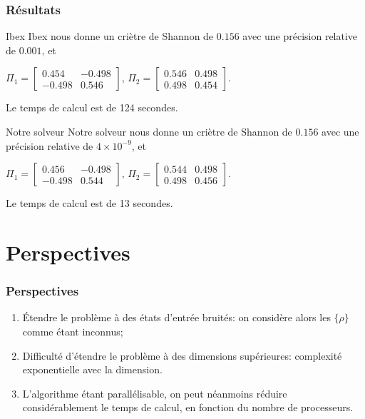 \documentclass{beamer}
\begin{document}
\begin{frame}
    \frametitle{Résultats}

    \begin{block}{Ibex}
        Ibex nous donne un criètre de Shannon de $0.156$ avec une précision relative de $0.001$, et
        
        $\Pi_1 = \begin{bmatrix} 0.454 & -0.498 \\ -0.498 & 0.546 \end{bmatrix}$, \quad $\Pi_2 = \begin{bmatrix}0.546 & 0.498 \\ 0.498 & 0.454 \end{bmatrix}$.

        Le temps de calcul est de 124 secondes.
    \end{block}

    \begin{block}{Notre solveur}
        Notre solveur nous donne un criètre de Shannon de $0.156$ avec une précision relative de $4\times 10^{-9}$, et
        
        $\Pi_1 = \begin{bmatrix} 0.456 & -0.498 \\ -0.498 & 0.544 \end{bmatrix}$, \quad $\Pi_2 = \begin{bmatrix}0.544 & 0.498 \\ 0.498 & 0.456 \end{bmatrix}$.

        Le temps de calcul est de 13 secondes.
    \end{block}

\end{frame}


\section[Perspectives]{Perspectives}
\begin{frame}
    \frametitle{Perspectives}
    \begin{enumerate}
        \item \'Etendre le problème à des états d'entrée bruités: on considère alors les $\{\rho\}$ comme étant inconnus;
        \item Difficulté d'étendre le problème à des dimensions supérieures: complexité exponentielle avec la dimension.
        \item L'algorithme étant parallélisable, on peut néanmoins réduire considérablement le temps de calcul, en fonction du nombre de processeurs.
    \end{enumerate}
\end{frame}



\end{document}
